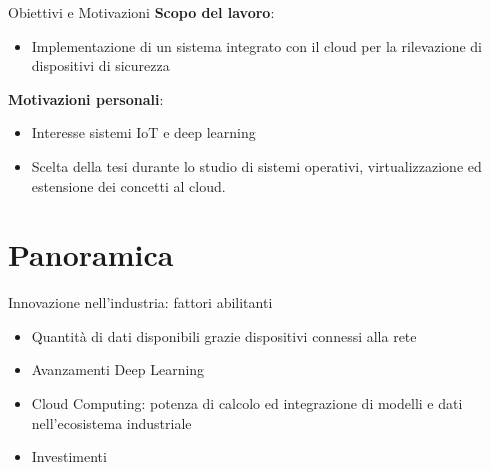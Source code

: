 \documentclass{beamer}
\begin{document}
\begin{frame}{Obiettivi e Motivazioni}
\textbf{Scopo del lavoro}:
\begin{itemize}
\vspace{0.2cm}
	\item Implementazione di un sistema integrato con il cloud per la rilevazione di dispositivi di sicurezza    
\end{itemize}
\vspace{0.3cm}
\textbf{Motivazioni personali}:
\begin{itemize}
    \item Interesse sistemi IoT e deep learning
    \item Scelta della tesi durante lo studio di sistemi operativi, virtualizzazione ed estensione dei concetti al cloud.
\end{itemize}
\end{frame}







\section{Panoramica}

\begin{frame}{Innovazione nell'industria: fattori abilitanti}
\begin{itemize}
	\item Quantità di dati disponibili grazie dispositivi connessi alla rete
	\item Avanzamenti Deep Learning
	\item Cloud Computing: potenza di calcolo ed integrazione di modelli e dati nell'ecosistema industriale
	\item Investimenti %
\end{itemize}
\end{frame}
\end{document}
